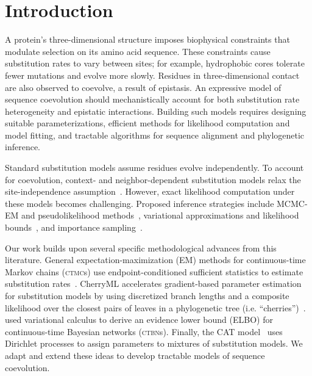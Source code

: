 \documentclass{article}
\newcommand{\CTBN}{\textsc{ctbn}}
\newcommand{\CTMC}{\textsc{ctmc}}
\begin{document}
\section{Introduction}
\label{sec:intro}

A protein's three-dimensional structure imposes biophysical constraints that modulate selection on its amino acid sequence.
These constraints cause substitution rates to vary between sites; for example, hydrophobic cores tolerate fewer mutations and evolve more slowly.
Residues in three-dimensional contact are also observed to coevolve, a result of epistasis.
An expressive model of sequence coevolution should mechanistically account for both substitution rate heterogeneity and epistatic interactions.
Building such models requires designing suitable parameterizations, efficient methods for likelihood computation and model fitting, and tractable algorithms for sequence alignment and phylogenetic inference.

Standard substitution models assume residues evolve independently. 
To account for coevolution, context- and neighbor-dependent substitution models relax the site-independence assumption~\cite{ArndtBurgeHwa2003NeighborDependent,JensenPedersen2000ContextDependent,LunterHein2004NearestNeighbor,SiepelHaussler2004ContextML}.
However, exact likelihood computation under these models becomes challenging.
Proposed inference strategies include MCMC-EM and pseudolikelihood 
methods~\cite{ChristensenHobolthJensen2005PseudoLikelihood,Hobolth2008MCMCEM}, 
variational approximations and likelihood bounds~\cite{cohn2010,JojicEtAl2004PhyloHMM,MatsenRalph2022BoundingDependency,WexlerGeiger2007VariationalUpper}, 
and importance sampling~\cite{MathewsSchmidler2025ImportanceSampling}. 

Our work builds upon several specific methodological advances from this literature.
General expectation-maximization (EM) methods for continuous-time Markov 
chains (\CTMC s) use endpoint-conditioned sufficient statistics to estimate substitution 
rates~\cite{HolmesRubin2002,HobolthJensen2005,HobolthJensen2011}. 
CherryML accelerates gradient-based parameter estimation for substitution models by using discretized 
branch lengths and a composite likelihood over the closest pairs of leaves in a phylogenetic tree (i.e. ``cherries'')~\cite{Prillo2023CherryML}. 
\citet{cohn2010} used variational calculus to derive an evidence lower bound (ELBO) for continuous-time Bayesian networks (\CTBN s).
Finally, the CAT model~\cite{Lartillot2004} uses Dirichlet processes to assign parameters to mixtures of substitution models.
 We adapt and extend these ideas to develop tractable models of sequence coevolution.
\end{document}
